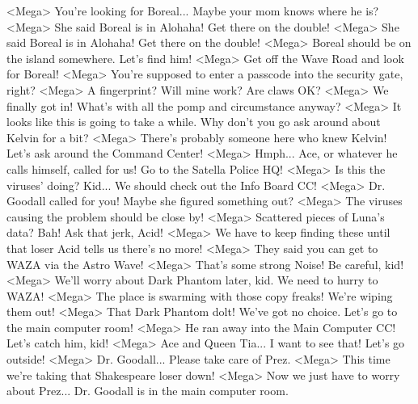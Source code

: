 <Mega> You're looking for Boreal... Maybe your mom knows where he is? 
<Mega> She said Boreal is in Alohaha! Get there on the double! 
<Mega> She said Boreal is in Alohaha! Get there on the double! 
<Mega> Boreal should be on the island somewhere. Let's find him! 
<Mega> Get off the Wave Road and look for Boreal! 
<Mega> You're supposed to enter a passcode into the security gate, right? 
<Mega> A fingerprint? Will mine work? Are claws OK? 
<Mega> We finally got in! What's with all the pomp and circumstance anyway? 
<Mega> It looks like this is going to take a while. Why don't 
you go ask around about Kelvin for a bit? 
<Mega> There's probably someone here who knew Kelvin! 
Let's ask around the Command Center! 
<Mega> Hmph... Ace, or whatever he calls himself, called for us! Go to the Satella Police HQ! 
<Mega> Is this the viruses' doing? Kid... We should check out the Info Board CC! 
<Mega> Dr. Goodall called for you! Maybe she figured something out? 
<Mega> The viruses causing the problem should be close by! 
<Mega> Scattered pieces of Luna's data? Bah! Ask that jerk, Acid! 
<Mega> We have to keep finding these until that loser Acid tells us there's no more! 
<Mega> They said you can get to WAZA via the Astro Wave! 
<Mega> That's some strong Noise! Be careful, kid! 
<Mega> We'll worry about Dark Phantom later, kid. We need to hurry to WAZA! 
<Mega> The place is swarming with those copy freaks! We're wiping them out! 
<Mega> That Dark Phantom dolt! We've got no choice. Let's go to the main computer room! 
<Mega> He ran away into the Main Computer CC! Let's catch him, kid! 
<Mega> Ace and Queen Tia... I want to see that! Let's go outside! 
<Mega> Dr. Goodall... Please take care of Prez. 
<Mega> This time we're taking that Shakespeare loser down! 
<Mega> Now we just have to worry about Prez... Dr. Goodall is in the main computer room. 
